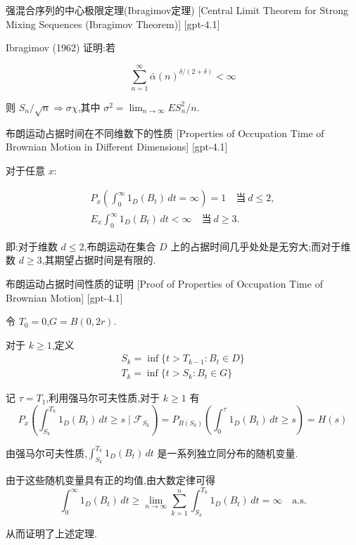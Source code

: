\documentclass[UTF8]{ctexart}
\begin{document}
    
    
    \begin{thm}
        {强混合序列的中心极限定理(Ibragimov定理)}
        [Central Limit Theorem for Strong Mixing Sequences (Ibragimov Theorem)]
        [gpt-4.1]
        
Ibragimov (1962) 证明:若

\[
\sum_{n=1}^{\infty} \bar{\alpha}(n)^{\delta/(2+\delta)} < \infty
\]

则 $S_{n} / \sqrt{n} \Rightarrow \sigma \chi$,其中 $\sigma^{2} = \lim_{n \to \infty} E S_{n}^{2} / n$.

    \end{thm}
    
    
    
    \begin{thm}
        {布朗运动占据时间在不同维数下的性质}
        [Properties of Occupation Time of Brownian Motion in Different Dimensions]
        [gpt-4.1]
        
对于任意 $x$:

\[
\begin{array}{lll}
P_x\left(\displaystyle \int_{0}^{\infty} 1_D(B_t)\,dt = \infty\right) = 1 \quad \text{当}~d \leq 2, \\
E_x\displaystyle \int_{0}^{\infty} 1_D(B_t)\,dt < \infty \quad \text{当}~d \geq 3.
\end{array}
\]

即:对于维数 $d \leq 2$,布朗运动在集合 $D$ 上的占据时间几乎处处是无穷大;而对于维数 $d \geq 3$,其期望占据时间是有限的.

    \end{thm}
    
    
    
    \begin{prf}
        {布朗运动占据时间性质的证明}
        [Proof of Properties of Occupation Time of Brownian Motion]
        [gpt-4.1]
        
令 $T_0 = 0$,$G = B(0, 2r)$.

对于 $k \geq 1$,定义
\[
\begin{array}{l}
S_k = \operatorname*{inf}\{t > T_{k-1} : B_t \in D\} \\
T_k = \operatorname*{inf}\{t > S_k : B_t \in G\}
\end{array}
\]

记 $\tau = T_1$,利用强马尔可夫性质,对于 $k \geq 1$ 有
\[
P_x\left(\int_{S_k}^{T_k} 1_D(B_t)\,dt \geq s \mid {\mathcal{F}}_{S_k}\right) = P_{B(S_k)}\left(\int_{0}^{\tau} 1_D(B_t)\,dt \geq s\right) = H(s)
\]

由强马尔可夫性质,$\int_{S_k}^{T_k} 1_D(B_t)\,dt$ 是一系列独立同分布的随机变量.

由于这些随机变量具有正的均值,由大数定律可得
\[
\int_{0}^{\infty} 1_D(B_t)\,dt \geq \lim_{n \to \infty} \sum_{k=1}^{n} \int_{S_k}^{T_k} 1_D(B_t)\,dt = \infty \quad \text{a.s.}
\]

从而证明了上述定理.

    \end{prf}
    
\end{document}

